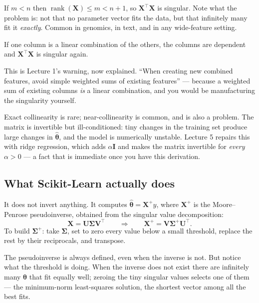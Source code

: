 \documentclass[11pt,a4paper]{article}
\begin{document}
\begin{failbox}[title={Failure condition --- more features than instances}]
If $m < n$ then $\operatorname{rank}(\mathbf{X}) \le m < n+1$, so
$\mathbf{X}^{\intercal}\mathbf{X}$ is singular. Note what the problem is: not
that no parameter vector fits the data, but that infinitely many fit it
\emph{exactly}. Common in genomics, in text, and in any wide-feature setting.
\end{failbox}

\begin{failbox}[title={Failure condition --- collinear features}]
If one column is a linear combination of the others, the columns are dependent
and $\mathbf{X}^{\intercal}\mathbf{X}$ is singular again.

This is Lecture 1's warning, now explained. ``When creating new combined
features, avoid simple weighted sums of existing features'' --- because a
weighted sum of existing columns \emph{is} a linear combination, and you would
be manufacturing the singularity yourself.
\end{failbox}

Exact collinearity is rare; near-collinearity is common, and is also a problem.
The matrix is invertible but ill-conditioned: tiny changes in the training set
produce large changes in $\hat{\boldsymbol\theta}$, and the model is
numerically unstable. Lecture 5 repairs this with ridge regression, which adds
$\alpha\mathbf{I}$ and makes the matrix invertible for \emph{every}
$\alpha > 0$ --- a fact that is immediate once you have this derivation.

\subsection{What Scikit-Learn actually does}

It does not invert anything. It computes $\hat{\boldsymbol\theta} =
\mathbf{X}^{+}y$, where $\mathbf{X}^{+}$ is the Moore--Penrose pseudoinverse,
obtained from the singular value decomposition:
\[ \mathbf{X} = \mathbf{U}\boldsymbol\Sigma\mathbf{V}^{\intercal}
   \qquad\Longrightarrow\qquad
   \mathbf{X}^{+} = \mathbf{V}\boldsymbol\Sigma^{+}\mathbf{U}^{\intercal}. \]
To build $\boldsymbol\Sigma^{+}$: take $\boldsymbol\Sigma$, set to zero every
value below a small threshold, replace the rest by their reciprocals, and
transpose.

The pseudoinverse is always defined, even when the inverse is not. But notice
what the threshold is doing. When the inverse does not exist there are
infinitely many $\boldsymbol\theta$ that fit equally well; zeroing the tiny
singular values selects one of them --- the minimum-norm least-squares
solution, the shortest vector among all the best fits.
\end{document}
